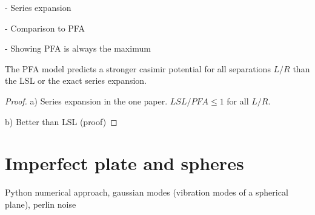 - Series expansion

- Comparison to PFA

- Showing PFA is always the maximum

\begin{theorem}
  The PFA model predicts a stronger casimir potential for all separations $L/R$ than the LSL or the exact series expansion.
\end{theorem}
\begin{proof}
  a) Series expansion in the one paper. $LSL/PFA \leq 1$ for all $L/R$.

  b) Better than LSL (proof)
\end{proof}


\section{Imperfect plate and spheres}
\label{sec:3:imperfect-plates}

Python numerical approach, gaussian modes (vibration modes of a spherical plane), perlin noise




